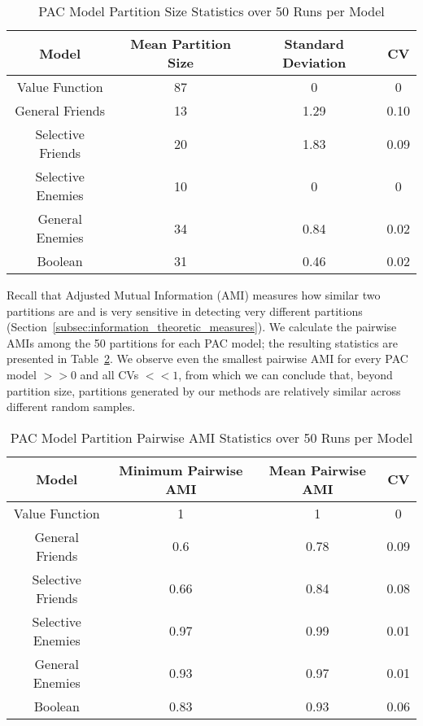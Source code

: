 \begin{table}[ht]
\centering
\begin{tabular}{|c|c|c|c|}
\hline
  Model & Mean Partition Size & Standard Deviation & CV \\ \hline
Value Function & 87 & 0 & 0 \\
General Friends & 13 & 1.29 & 0.10  \\
Selective Friends & 20 & 1.83 & 0.09  \\
Selective Enemies & 10 & 0 & 0 \\
General Enemies & 34 & 0.84 & 0.02 \\
Boolean & 31 & 0.46 & 0.02  \\
\hline
\end{tabular}
\caption{PAC Model Partition Size Statistics over 50 Runs per Model}
\label{Analysis:table:pac_num_coalitions}
\end{table}

Recall that Adjusted Mutual Information (AMI) measures how similar two
partitions are and is very sensitive in detecting very different partitions 
(Section~\ref{subsec:information_theoretic_measures}).
We calculate the pairwise AMIs among the 50 partitions for each PAC model;
the resulting statistics are presented in Table~\ref{Analysis:table:pac_pairwise_amis}.
We observe even the smallest pairwise AMI for every PAC model $>> 0$ and all CVs
$<< 1$, from which we can conclude that, beyond partition size, partitions
generated by our methods are relatively similar across different random samples.

\begin{table}[ht]
\centering
\begin{tabular}{|c|c|c|c|}
\hline
  Model & Minimum Pairwise AMI & Mean Pairwise AMI & CV \\ \hline
Value Function & 1 & 1 & 0 \\
General Friends & 0.6 & 0.78 & 0.09  \\
Selective Friends & 0.66 & 0.84 & 0.08  \\
Selective Enemies & 0.97 & 0.99 & 0.01 \\
General Enemies & 0.93 & 0.97 & 0.01 \\
Boolean & 0.83 & 0.93 & 0.06  \\
\hline
\end{tabular}
\caption{PAC Model Partition Pairwise AMI Statistics over 50 Runs per Model}
\label{Analysis:table:pac_pairwise_amis}
\end{table}

